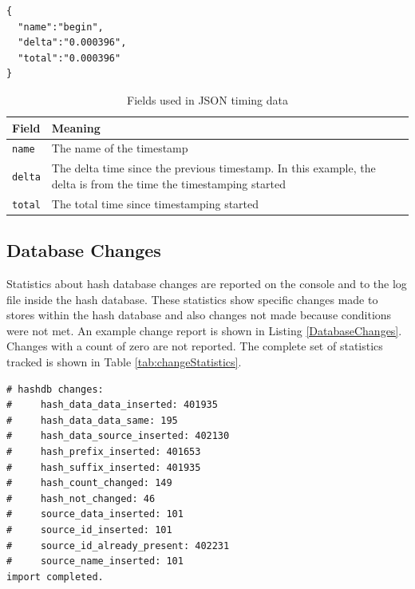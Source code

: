 \documentclass[11pt,fleqn]{article} %
\begin{document}
\lstset{style=customfile}
\begin{lstlisting}[float, caption={Example JSON timestamp format}, label=JSONTimingData]
{
  "name":"begin",
  "delta":"0.000396",
  "total":"0.000396"
}
\end{lstlisting}

\begin{table}[!ht]

\centering
\caption{Fields used in JSON timing data}
\label{tab:JSONTimingData}
\begin{tabular}{|p{5 cm}|p{8.8 cm}|}
\hline \hline
\textbf{Field} & \textbf{Meaning} \\
\hline
\verb+name+ & The name of the timestamp\\
\hline
\verb+delta+ & The delta time since the previous timestamp. In this example, the delta is from the time the timestamping started\\
\hline
\verb+total+ & The total time since timestamping started\\
\hline
\end{tabular}
\end{table}

\subsection{Database Changes}
Statistics about hash database changes are reported on the console and to the log file inside the hash database. These statistics show specific changes made to stores within the hash database and also changes not made because conditions were not met. An example change report is shown in Listing \ref{DatabaseChanges}. Changes with a count of zero are not reported. The complete set of statistics tracked is shown in Table \ref{tab:changeStatistics}.

\lstset{style=customfile}
\begin{lstlisting}[float, caption={Example report of a database change from an import operation}, label=DatabaseChanges]
# hashdb changes:
#     hash_data_data_inserted: 401935
#     hash_data_data_same: 195
#     hash_data_source_inserted: 402130
#     hash_prefix_inserted: 401653
#     hash_suffix_inserted: 401935
#     hash_count_changed: 149
#     hash_not_changed: 46
#     source_data_inserted: 101
#     source_id_inserted: 101
#     source_id_already_present: 402231
#     source_name_inserted: 101
import completed.
\end{lstlisting}
\end{document}
